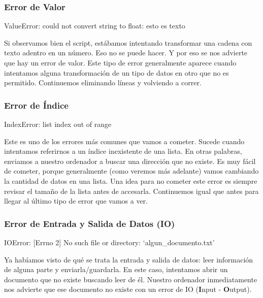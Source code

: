 \documentclass[10pt,letterpaper]{article}
\newenvironment{Code}
{
\begin{lrbox}{\selvestebox}%
\begin{minipage}{\dimexpr\columnwidth-2\fboxsep\relax}
\fontfamily{\ttdefault}\selectfont
}
{\end{minipage}\end{lrbox}%
\begin{center}
\colorbox{light-gray}{\usebox{\selvestebox}}
\end{center}
}
\begin{document}
\subsubsection{Error de Valor}

\begin{Code}
{\color{red} ValueError: could not convert string to float: esto es texto}
\end{Code}

Si observamos bien el script, est\'abamos intentando transformar una cadena con texto adentro en un n\'umero. Eso no se puede hacer. Y por eso se nos advierte que hay un error de valor. Este tipo de error generalmente aparece cuando intentamos alguna transformaci\'on de un tipo de datos en otro que no es permitido. Continuemos eliminando l\'ineas y volviendo a correr.

\subsubsection{Error de \'Indice}

\begin{Code}
{\color{red} IndexError: list index out of range}
\end{Code}

Este es uno de los errores m\'as comunes que vamos a cometer. Sucede cuando intentamos referirnos a un \'indice inexistente de una lista. En otras palabras, enviamos a nuestro ordenador a buscar una direcci\'on que no existe. Es muy f\'acil de cometer, porque generalmente (como veremos m\'as adelante) vamos cambiando la cantidad de datos en una lista. Una idea para no cometer este error es siempre revisar el tama\~no de la lista antes de accesarla. Continuemos igual que antes para llegar al \'ultimo tipo de error que vamos a ver.

\subsubsection{Error de Entrada y Salida de Datos (IO)}

\begin{Code}
{\color{red} IOError: [Errno 2] No such file or directory: `algun\_documento.txt'}
\end{Code}

Ya hab\'iamos visto de qu\'e se trata la entrada y salida de datos: leer informaci\'on de alguna parte y enviarla/guardarla. En este caso, intentamos abrir un documento que no existe buscando leer de \'el. Nuestro ordenador inmediatamente nos advierte que ese documento no existe con un error de IO (\textbf{I}nput - \textbf{O}utput).
\end{document}

